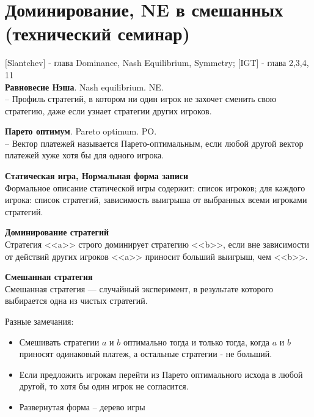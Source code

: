 \documentclass[pdftex,12pt,a4paper]{article}
\begin{document}
\section{Доминирование, NE в смешанных (технический семинар) }

$[$Slantchev$]$ - глава Dominance, Nash Equilibrium, Symmetry; $[$IGT$]$ - глава 2,3,4, 11\\


\textbf{Равновесие Нэша}. Nash equilibrium. NE.\\
-- Профиль стратегий, в котором ни один игрок не захочет сменить свою стратегию, даже если узнает стратегии других игроков. 

\textbf{Парето оптимум}. Pareto optimum. PO.\\
-- Вектор платежей называется Парето-оптимальным, если любой другой вектор платежей хуже хотя бы для одного игрока.

\textbf{Статическая игра, Нормальная форма записи} \\
Формальное описание статической игры содержит: список игроков; для каждого игрока: список стратегий, зависимость выигрыша от выбранных всеми игроками стратегий. 

\textbf{Доминирование стратегий} \\
Стратегия <<a>> строго доминирует стратегию <<b>>, если вне зависимости от действий других игроков <<a>> приносит больший выигрыш, чем <<b>>.

\textbf{Смешанная стратегия} \\
Смешанная стратегия --- случайный эксперимент, в результате которого выбирается одна из чистых стратегий.



Разные замечания: 
\begin{itemize}
\item Смешивать стратегии $a$ и $b$ оптимально тогда и только тогда, когда $a$ и $b$ приносят одинаковый платеж, а остальные стратегии - не больший. \\
\item Если предложить игрокам перейти из Парето оптимального исхода в любой другой, то хотя бы один игрок не согласится.\\
\item Развернутая форма -- дерево игры
\end{itemize}
\end{document}

